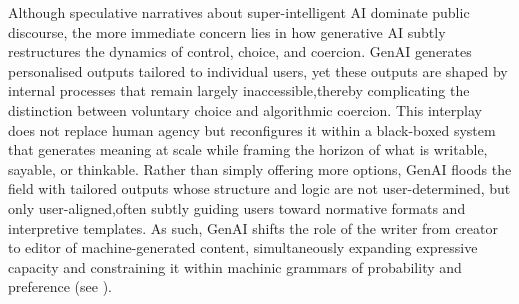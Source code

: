 Although speculative narratives about super-intelligent AI dominate public discourse, the more immediate concern lies in how generative AI subtly restructures the dynamics of control, choice, and coercion.
GenAI generates personalised outputs tailored to individual users, yet these outputs are shaped by internal processes that remain largely inaccessible,thereby complicating the distinction between voluntary choice and algorithmic coercion. This interplay does not replace human agency but reconfigures it within a black-boxed system that generates meaning at scale while framing the horizon of what is writable, sayable, or thinkable. Rather than simply offering more options, GenAI floods the field with tailored outputs whose structure and logic are not user-determined, but only user-aligned,often subtly guiding users toward normative formats and interpretive templates. As such, GenAI shifts the role of the writer from creator to editor of machine-generated content, simultaneously expanding expressive capacity and constraining it within machinic grammars of probability and preference (see \cite[974--975]{dishon2024}).



